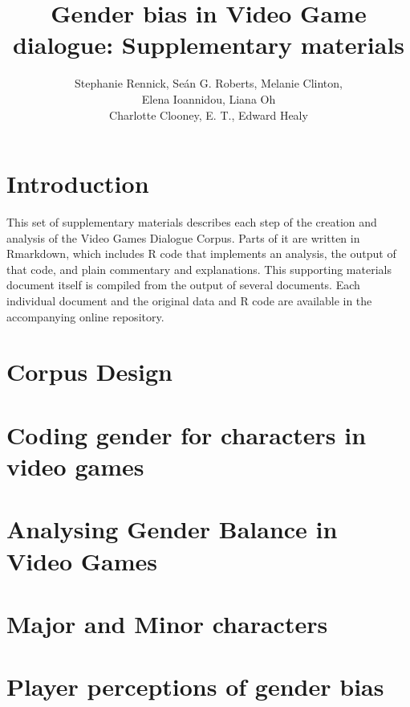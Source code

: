 \documentclass[12pt,a4paper]{article}
\author{Stephanie Rennick, Se\'{a}n G. Roberts, Melanie Clinton,\\Elena Ioannidou, Liana Oh\\Charlotte Clooney, E. T., Edward Healy}
\title{Gender bias in Video Game dialogue: Supplementary materials}
\newcommand{\includepdfPlus}[1]{}
\begin{document}
\maketitle
\tableofcontents

\clearpage
\newpage

\section{Introduction}

This set of supplementary materials describes each step of the creation and analysis of the Video Games Dialogue Corpus. Parts of it are written in Rmarkdown, which includes R code that implements an analysis, the output of that code, and plain commentary and explanations. This supporting materials document itself is compiled from the output of several documents. Each individual document and the original data and R code are available in the accompanying online repository.

\clearpage
\newpage
\section{Corpus Design}

\includepdfPlus{../../writeup/CorpusDescription.pdf}

\clearpage
\newpage

\section{Coding gender for characters in video games}

\includepdfPlus{../../writeup/CodingScheme.pdf}

\clearpage
\newpage

\section{Analysing Gender Balance in Video Games}

\includepdfPlus{../../analysis/Analyse_WordsPerGender.pdf}

\clearpage
\newpage
\section{Major and Minor characters}

\includepdfPlus{../../analysis/Analyse_MajorVsMinorCharacters.pdf}

\clearpage
\newpage
\section{Player perceptions of gender bias}
\end{document}
